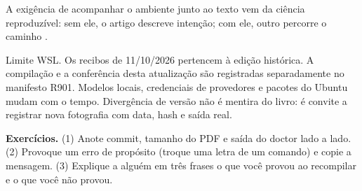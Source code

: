 A exigência de acompanhar o ambiente junto ao texto vem da ciência reproduzível: sem ele, o artigo descreve intenção; com ele, outro percorre o caminho .

\begin{aviso}
Limite WSL. Os recibos de 11/10/2026 pertencem à edição histórica. A compilação e a conferência desta atualização são registradas separadamente no manifesto R901. Modelos locais, credenciais de provedores e pacotes do Ubuntu mudam com o tempo. Divergência de versão não é mentira do livro: é convite a registrar nova fotografia com data, hash e saída real.
\end{aviso}

\begin{resultado}
\textbf{Exercícios.} (1) Anote commit, tamanho do PDF e saída do doctor lado a lado. (2) Provoque um erro de propósito (troque uma letra de um comando) e copie a mensagem. (3) Explique a alguém em três frases o que você provou ao recompilar e o que você não provou.
\end{resultado}

